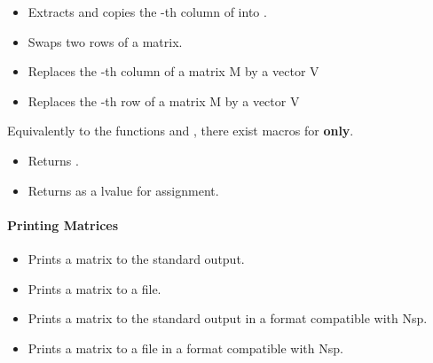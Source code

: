 \begin{itemize}
\item {}
  \sshortdescribe Extracts and copies the -th column of  into .
  
\item {}
  \sshortdescribe Swaps two rows of a matrix.  

\item {}
  \sshortdescribe Replaces the -th column of a matrix M by a vector V 

\item {}
  \sshortdescribe Replaces the -th row of a matrix M by a vector V  
\end{itemize}

Equivalently to the functions  and ,
there exist macros for {\bf {} only}.
\begin{itemize}
\item {}
  \sshortdescribe Returns .
  
\item {}
  \sshortdescribe Returns  as a lvalue for assignment.
\end{itemize}


\paragraph{Printing Matrices}

\begin{itemize}
\item {}
  \sshortdescribe Prints a matrix to the standard output.  

\item {}
  \sshortdescribe Prints a matrix to a file.

\item {}
  \sshortdescribe Prints a matrix to the standard output in a format
  compatible with Nsp.  

\item {}
  \sshortdescribe Prints a matrix to a file in a format compatible with Nsp.
\end{itemize}

